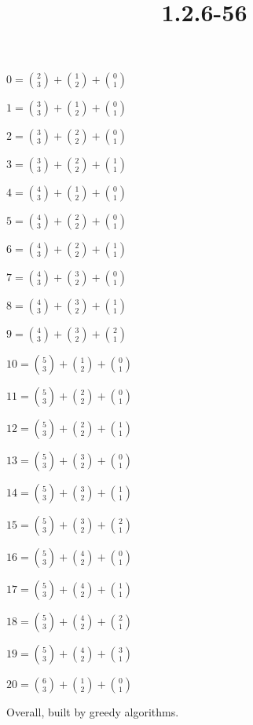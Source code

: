\documentclass{article}
\title{1.2.6-56}
\begin{document}
\maketitle

\( 0 = \binom{2}{3} + \binom{1}{2} + \binom{0}{1} \)

\( 1 = \binom{3}{3} + \binom{1}{2} + \binom{0}{1} \)

\( 2 = \binom{3}{3} + \binom{2}{2} + \binom{0}{1} \)

\( 3 = \binom{3}{3} + \binom{2}{2} + \binom{1}{1} \)

\( 4 = \binom{4}{3} + \binom{1}{2} + \binom{0}{1} \)

\( 5 = \binom{4}{3} + \binom{2}{2} + \binom{0}{1} \)

\( 6 = \binom{4}{3} + \binom{2}{2} + \binom{1}{1} \)

\( 7 = \binom{4}{3} + \binom{3}{2} + \binom{0}{1} \)

\( 8 = \binom{4}{3} + \binom{3}{2} + \binom{1}{1} \)

\( 9 = \binom{4}{3} + \binom{3}{2} + \binom{2}{1} \)

\( 10 = \binom{5}{3} + \binom{1}{2} + \binom{0}{1} \)

\( 11 = \binom{5}{3} + \binom{2}{2} + \binom{0}{1} \)

\( 12 = \binom{5}{3} + \binom{2}{2} + \binom{1}{1} \)

\( 13 = \binom{5}{3} + \binom{3}{2} + \binom{0}{1} \)

\( 14 = \binom{5}{3} + \binom{3}{2} + \binom{1}{1} \)

\( 15 = \binom{5}{3} + \binom{3}{2} + \binom{2}{1} \)

\( 16 = \binom{5}{3} + \binom{4}{2} + \binom{0}{1} \)

\( 17 = \binom{5}{3} + \binom{4}{2} + \binom{1}{1} \)

\( 18 = \binom{5}{3} + \binom{4}{2} + \binom{2}{1} \)

\( 19 = \binom{5}{3} + \binom{4}{2} + \binom{3}{1} \)

\( 20 = \binom{6}{3} + \binom{1}{2} + \binom{0}{1} \)

Overall, built by greedy algorithms.
\end{document}
